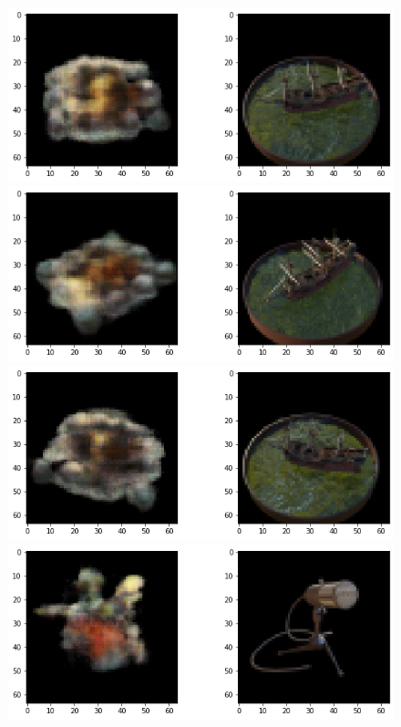 \documentclass[10pt,twocolumn,letterpaper]{article}
\begin{document}
\begin{CJK}{UTF8}{bkai}
   \begin{figure}
      \begin{center}
         \includegraphics[width=1\linewidth]{img/experiment/test_0.png}
         \includegraphics[width=1\linewidth]{img/experiment/test_1.png}
         \includegraphics[width=1\linewidth]{img/experiment/test_2.png}
         \includegraphics[width=1\linewidth]{img/experiment/test_3.png}

\end{center}
\end{figure}
\end{CJK}
\end{document}
